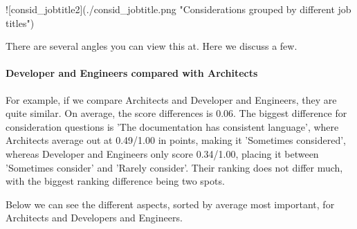 \documentclass{article}
\begin{document}
![consid_jobtitle2](./consid_jobtitle.png "Considerations grouped by different job titles")

There are several angles you can view this at. Here we discuss a few.

\paragraph{Developer and Engineers compared with Architects}

For example, if we compare Architects and Developer and Engineers, they
are quite similar. On average, the score differences is 0.06. The
biggest difference for consideration questions is 'The documentation has
consistent language', where Architects average out at 0.49/1.00 in
points, making it 'Sometimes considered', whereas Developer and
Engineers only score 0.34/1.00, placing it between 'Sometimes consider'
and 'Rarely consider'. Their ranking does not differ much, with the
biggest ranking difference being two spots.

Below we can see the different aspects, sorted by average most
important, for Architects and Developers and Engineers.
\end{document}
